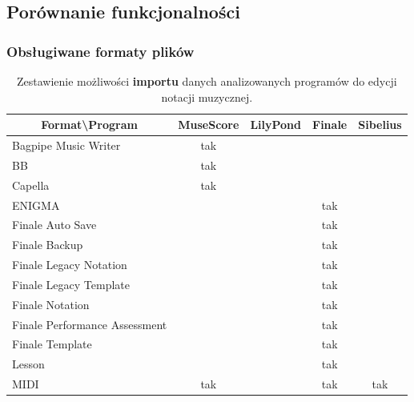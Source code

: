 \documentclass[polish,thesis,12pt]{dcsbook}
\begin{document}
\subsection{Porównanie funkcjonalności}
\subsubsection{Obsługiwane formaty plików}
\begin{center}
\begin{longtable}{|l|c|c|c|c|}
\caption{Zestawienie możliwości \textbf{importu} danych analizowanych programów do edycji notacji muzycznej.} \label{edytory-import} \\
\hline
\multicolumn{1}{|c|}{\textbf{Format{\textbackslash}Program}} & MuseScore & LilyPond & Finale & Sibelius \\ \hline
Bagpipe Music Writer                          & tak       &          &        &          \\ \hline
BB                                            & tak       &          &        &          \\ \hline
Capella                                       & tak       &          &        &          \\ \hline
ENIGMA                                        &           &          & tak    &          \\ \hline
Finale Auto Save                              &           &          & tak    &          \\ \hline
Finale Backup                                 &           &          & tak    &          \\ \hline
Finale Legacy Notation                        &           &          & tak    &          \\ \hline
Finale Legacy Template                        &           &          & tak    &          \\ \hline
Finale Notation                               &           &          & tak    &          \\ \hline
Finale Performance Assessment                 &           &          & tak    &          \\ \hline
Finale Template                               &           &          & tak    &          \\ \hline
Lesson                                        &           &          & tak    &          \\ \hline
MIDI                                          & tak       &          & tak    & tak      \\ \hline

\end{longtable}
\end{center}
\end{document}
